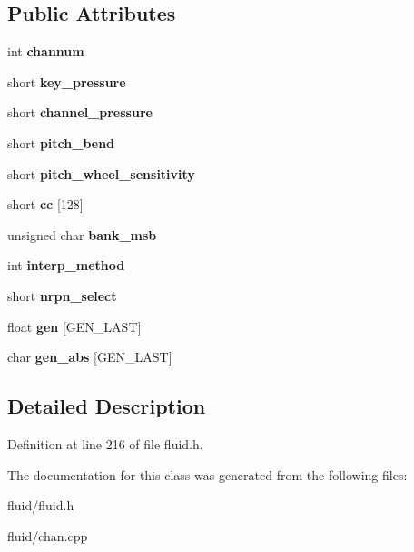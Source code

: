 \subsection*{Public Attributes}
\begin{DoxyCompactItemize}
\item 
\mbox{\label{class_fluid_s_1_1_channel_afcf23565b0c44b7083062099a6155512}} 
int {\bfseries channum}
\item 
\mbox{\label{class_fluid_s_1_1_channel_ad7268a20eb4d0c2a734150dba8984502}} 
short {\bfseries key\+\_\+pressure}
\item 
\mbox{\label{class_fluid_s_1_1_channel_af9f69a8258c411d3fcd02f873d91acd6}} 
short {\bfseries channel\+\_\+pressure}
\item 
\mbox{\label{class_fluid_s_1_1_channel_afb521086bf2f4b798a2cc9b9fc406dbe}} 
short {\bfseries pitch\+\_\+bend}
\item 
\mbox{\label{class_fluid_s_1_1_channel_aa0ba92b6898cb1756868f7fcbea49ad4}} 
short {\bfseries pitch\+\_\+wheel\+\_\+sensitivity}
\item 
\mbox{\label{class_fluid_s_1_1_channel_a35a11e729669bdc8a96bdb3d4ef4821d}} 
short {\bfseries cc} \mbox{[}128\mbox{]}
\item 
\mbox{\label{class_fluid_s_1_1_channel_a70adb48ad1205a2f70e52af5eb091504}} 
unsigned char {\bfseries bank\+\_\+msb}
\item 
\mbox{\label{class_fluid_s_1_1_channel_a6638226d6416a9d2100cf6691ec38cb9}} 
int {\bfseries interp\+\_\+method}
\item 
\mbox{\label{class_fluid_s_1_1_channel_a8c32230e54e127ebfabebdee697d2c1d}} 
short {\bfseries nrpn\+\_\+select}
\item 
\mbox{\label{class_fluid_s_1_1_channel_aeb172e3301c40509053168ef34b1d38b}} 
float {\bfseries gen} \mbox{[}G\+E\+N\+\_\+\+L\+A\+ST\mbox{]}
\item 
\mbox{\label{class_fluid_s_1_1_channel_aeb63bfcdcec9a0bc445c7b2191f65608}} 
char {\bfseries gen\+\_\+abs} \mbox{[}G\+E\+N\+\_\+\+L\+A\+ST\mbox{]}
\end{DoxyCompactItemize}


\subsection{Detailed Description}


Definition at line 216 of file fluid.\+h.



The documentation for this class was generated from the following files\+:\begin{DoxyCompactItemize}
\item 
fluid/fluid.\+h\item 
fluid/chan.\+cpp\end{DoxyCompactItemize}
